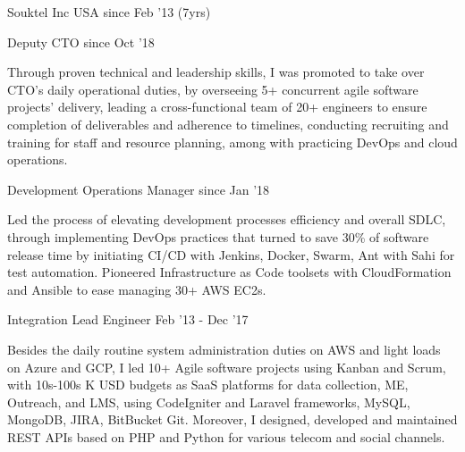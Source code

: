 
\begin{cventries}

  \cvgroupentry
    {Souktel Inc} %
    {USA} %
    {since Feb ’13 (7yrs)} %

  \cvposentry
    {Deputy CTO} %
    {since Oct ’18} %
    {
      \begin{cvitems} %
        {Through proven technical and leadership skills, I was promoted to take over CTO’s daily operational duties, by overseeing 5+ concurrent agile software projects’ delivery, leading a cross-functional team of 20+ engineers to ensure completion of deliverables and adherence to timelines, conducting recruiting and training for staff and resource planning, among with practicing DevOps and cloud operations.}
      \end{cvitems}
    }

  \cvposentry
    {Development Operations Manager} %
    {since Jan ’18} %
    {
      \begin{cvitems} %
        {Led the process of elevating development processes efficiency and overall SDLC, through implementing DevOps practices that turned to save 30\% of software release time by initiating CI/CD with Jenkins, Docker, Swarm, Ant with Sahi for test automation. Pioneered Infrastructure as Code toolsets with CloudFormation and Ansible to ease managing 30+ AWS EC2s.}
      \end{cvitems}
    }

\cvposentry
    {Integration Lead Engineer} %
    {Feb ’13 - Dec ’17} %
    {
      \begin{cvitems} %
        {Besides the daily routine system administration duties on AWS and light loads on Azure and GCP, I led 10+ Agile software projects using Kanban and Scrum, with 10s-100s K USD budgets as SaaS platforms for data collection, ME, Outreach, and LMS, using CodeIgniter and Laravel frameworks, MySQL, MongoDB, JIRA, BitBucket Git. Moreover, I designed, developed and maintained REST APIs based on PHP and Python for various telecom and social channels.}
      \end{cvitems}
    }


\end{cventries}
